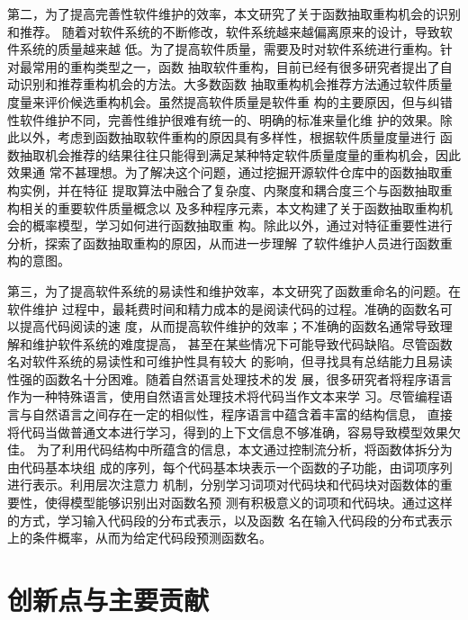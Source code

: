 第二，为了提高完善性软件维护的效率，本文研究了关于函数抽取重构机会的识别和推荐。
随着对软件系统的不断修改，软件系统越来越偏离原来的设计，导致软件系统的质量越来越
低。为了提高软件质量，需要及时对软件系统进行重构。针对最常用的重构类型之一，函数
抽取软件重构，目前已经有很多研究者提出了自动识别和推荐重构机会的方法。大多数函数
抽取重构机会推荐方法通过软件质量度量来评价候选重构机会。虽然提高软件质量是软件重
构的主要原因，但与纠错性软件维护不同，完善性维护很难有统一的、明确的标准来量化维
护的效果。除此以外，考虑到函数抽取软件重构的原因具有多样性，根据软件质量度量进行
函数抽取机会推荐的结果往往只能得到满足某种特定软件质量度量的重构机会，因此效果通
常不甚理想。为了解决这个问题，通过挖掘开源软件仓库中的函数抽取重构实例，并在特征
提取算法中融合了复杂度、内聚度和耦合度三个与函数抽取重构相关的重要软件质量概念以
及多种程序元素，本文构建了关于函数抽取重构机会的概率模型，学习如何进行函数抽取重
构。除此以外，通过对特征重要性进行分析，探索了函数抽取重构的原因，从而进一步理解
了软件维护人员进行函数重构的意图。

第三，为了提高软件系统的易读性和维护效率，本文研究了函数重命名的问题。在软件维护
过程中，最耗费时间和精力成本的是阅读代码的过程。准确的函数名可以提高代码阅读的速
度，从而提高软件维护的效率；不准确的函数名通常导致理解和维护软件系统的难度提高，
甚至在某些情况下可能导致代码缺陷。尽管函数名对软件系统的易读性和可维护性具有较大
的影响，但寻找具有总结能力且易读性强的函数名十分困难。随着自然语言处理技术的发
展，很多研究者将程序语言作为一种特殊语言，使用自然语言处理技术将代码当作文本来学
习。尽管编程语言与自然语言之间存在一定的相似性，程序语言中蕴含着丰富的结构信息，
直接将代码当做普通文本进行学习，得到的上下文信息不够准确，容易导致模型效果欠佳。
为了利用代码结构中所蕴含的信息，本文通过控制流分析，将函数体拆分为由代码基本块组
成的序列，每个代码基本块表示一个函数的子功能，由词项序列进行表示。利用层次注意力
机制，分别学习词项对代码块和代码块对函数体的重要性，使得模型能够识别出对函数名预
测有积极意义的词项和代码块。通过这样的方式，学习输入代码段的分布式表示，以及函数
名在输入代码段的分布式表示上的条件概率，从而为给定代码段预测函数名。

\section{创新点与主要贡献}

